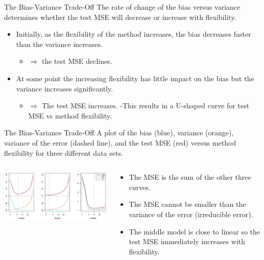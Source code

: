 \documentclass[
  ignorenonframetext,
  aspectratio=169,
]{beamer}
\providecommand{\tightlist}{%
  \setlength{\itemsep}{0pt}\setlength{\parskip}{0pt}}\usepackage{longtable,booktabs,array}
\begin{document}
\begin{frame}{The Bias-Variance Trade-Off}
\protect\hypertarget{the-bias-variance-trade-off-2}{}
The rate of change of the bias versus variance determines whether the
test MSE will decrease or increase with flexibility.

\begin{itemize}
\tightlist
\item
  Initially, as the flexibility of the method increases, the bias
  decreases faster than the variance increases.

  \begin{itemize}
  \tightlist
  \item
    \(\Rightarrow\) the test MSE declines.
  \end{itemize}
\item
  At some point the increasing flexibility has little impact on the bias
  but the variance increases significantly.

  \begin{itemize}
  \tightlist
  \item
    \(\Rightarrow\) The test MSE increases. -This results in a U-shaped
    curve for test MSE vs method flexibility.
  \end{itemize}
\end{itemize}
\end{frame}

\begin{frame}{The Bias-Variance Trade-Off}
\protect\hypertarget{the-bias-variance-trade-off-3}{}
A plot of the bias (blue), variance (orange), variance of the error
(dashed line), and the test MSE (red) versus method flexibility for
three different data sets.

\begin{columns}[T]
\begin{column}{0.7\textwidth}
\includegraphics[width=4.23958in,height=\textheight]{images/bias_variance.png}
\end{column}

\begin{column}{0.3\textwidth}
\begin{itemize}
\tightlist
\item
  The MSE is the sum of the other three curves.
\item
  The MSE cannot be smaller than the variance of the error (irreducible
  error).
\item
  The middle model is close to linear so the test MSE immediately
  increases with flexibility.
\end{itemize}
\end{column}
\end{columns}
\end{frame}
\end{document}
